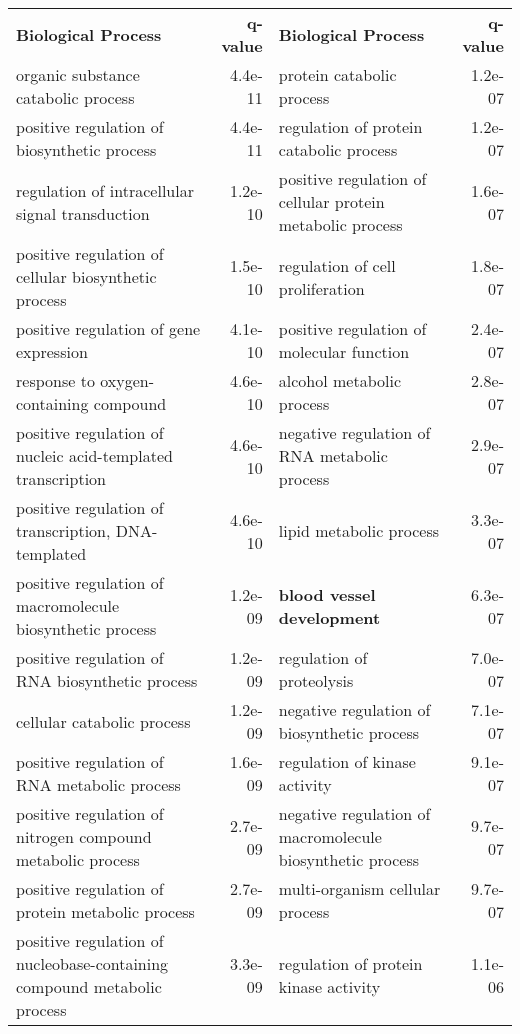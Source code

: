 \documentclass[fleqn,10pt]{SelfArx} %
\begin{document}
\begin{table}[ht]
	\centering
	\scriptsize
	\begin{tabularx}{\textwidth}{lRlR}
		\textbf{\color{white} Biological Process} & \textbf{\color{white} q-value} & \textbf{\color{white} Biological Process} & \textbf{\color{white} q-value}\\
		organic substance catabolic process & 4.4e-11 & protein catabolic process & 1.2e-07 \\ 
		positive regulation of biosynthetic process & 4.4e-11 & regulation of protein catabolic process & 1.2e-07 \\ 
		regulation of intracellular signal transduction & 1.2e-10 & positive regulation of cellular protein metabolic process & 1.6e-07 \\ 
		positive regulation of cellular biosynthetic process & 1.5e-10 & regulation of cell proliferation & 1.8e-07 \\ 
		positive regulation of gene expression & 4.1e-10 & positive regulation of molecular function & 2.4e-07 \\ 
		response to oxygen-containing compound & 4.6e-10 & alcohol metabolic process & 2.8e-07 \\ 
		positive regulation of nucleic acid-templated transcription & 4.6e-10 & negative regulation of RNA metabolic process & 2.9e-07 \\ 
		positive regulation of transcription, DNA-templated & 4.6e-10 & lipid metabolic process & 3.3e-07 \\ 
		positive regulation of macromolecule biosynthetic process & 1.2e-09 & \textbf{blood vessel development} & 6.3e-07 \\ 
		positive regulation of RNA biosynthetic process & 1.2e-09 & regulation of proteolysis & 7.0e-07 \\ 
		cellular catabolic process & 1.2e-09 & negative regulation of biosynthetic process & 7.1e-07 \\ 
		positive regulation of RNA metabolic process & 1.6e-09 & regulation of kinase activity & 9.1e-07 \\ 
		positive regulation of nitrogen compound metabolic process & 2.7e-09 & negative regulation of macromolecule biosynthetic process & 9.7e-07 \\ 
		positive regulation of protein metabolic process & 2.7e-09 & multi-organism cellular process & 9.7e-07 \\ 
		positive regulation of nucleobase-containing compound metabolic process & 3.3e-09 & regulation of protein kinase activity & 1.1e-06 \\ 

\end{tabularx}
\end{table}
\end{document}
